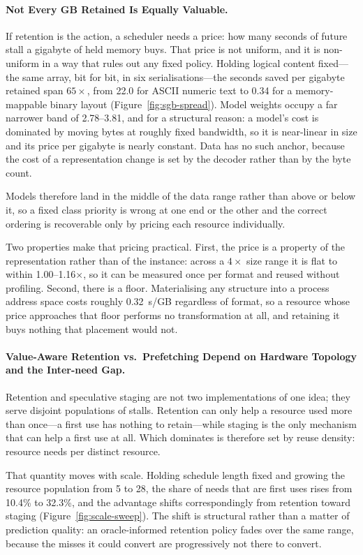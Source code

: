 \paragraph{Not Every GB Retained Is Equally Valuable.}
If retention is the action, a scheduler needs a price: how many seconds of
future stall a gigabyte of held memory buys. That price is not uniform, and it
is non-uniform in a way that rules out any fixed policy. Holding logical
content fixed---the same array, bit for bit, in six serialisations---the
seconds saved per gigabyte retained span $65\times$, from 22.0 for ASCII
numeric text to 0.34 for a memory-mappable binary layout
(Figure~\ref{fig:sgb-spread}). Model weights occupy a far narrower band of
2.78--3.81, and for a structural reason: a model's cost is dominated by moving
bytes at roughly fixed bandwidth, so it is near-linear in size and its price
per gigabyte is nearly constant. Data has no such anchor, because the cost of
a representation change is set by the decoder rather than by the byte count.

Models therefore land in the middle of the data range rather than above or
below it, so a fixed class priority is wrong at one end or the other and the
correct ordering is recoverable only by pricing each resource individually.

Two properties make that pricing practical. First, the price is a property of
the representation rather than of the instance: across a $4\times$ size range
it is flat to within 1.00--1.16$\times$, so it can be measured once per format
and reused without profiling. Second, there is a floor. Materialising any
structure into a process address space costs roughly 0.32~s/GB regardless of
format, so a resource whose price approaches that floor performs no
transformation at all, and retaining it buys nothing that placement would not.


\paragraph{Value-Aware Retention vs.\ Prefetching Depend on Hardware Topology
and the Inter-need Gap.}
Retention and speculative staging are not two implementations of one idea;
they serve disjoint populations of stalls. Retention can only help a resource
used more than once---a first use has nothing to retain---while staging is the
only mechanism that can help a first use at all. Which dominates is therefore
set by reuse density: resource needs per distinct resource.

That quantity moves with scale. Holding schedule length fixed and growing the
resource population from 5 to 28, the share of needs that are first uses rises
from 10.4\% to 32.3\%, and the advantage shifts correspondingly from retention
toward staging (Figure~\ref{fig:scale-sweep}). The shift is structural rather
than a matter of prediction quality: an oracle-informed retention policy fades
over the same range, because the misses it could convert are progressively not
there to convert.  %

